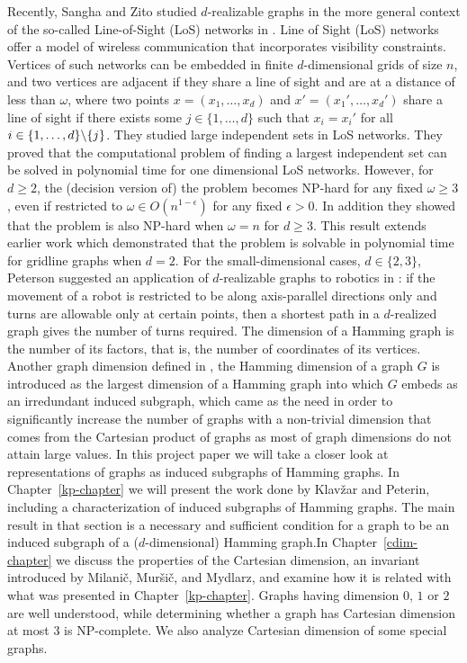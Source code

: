 \documentclass[12pt,a4paper,titlepage,openany]{report}
\begin{document}
Recently, Sangha and Zito studied $d$-realizable graphs in the more general context of the so-called Line-of-Sight (LoS) networks in \cite{Zito}. Line of Sight (LoS) networks offer a model of wireless communication that incorporates visibility constraints. Vertices of such networks can be embedded in finite $d$-dimensional grids of size $n$, and two vertices are adjacent if they share a line of sight and are at a distance of less than $\omega$, where two points $x=(x_1, \ldots,x_d)$ and $x'=(x_1',\ldots ,x_d')$ share a line of sight if there exists some $j\in \{1,\ldots,d\}$ such that $x_i=x_i'$ for all $i\in \{1,\ldots,d\} \symbol{92} \{j\}$. They studied large independent sets in LoS networks. They proved that the computational problem of finding a largest independent set can be solved in polynomial time for one dimensional LoS networks. However, for $d \geq 2$, the (decision version of) the problem becomes NP-hard for any fixed $\omega \geq 3$, even if restricted to $\omega \in O(n^{1-\epsilon})$ for any fixed $\epsilon>0$. In addition they showed that the problem is also NP-hard when $\omega = n$ for $d \geq 3$. This result extends earlier work which demonstrated that the problem is solvable in polynomial time for gridline graphs when $d = 2$. For the small-dimensional cases, $d \in \{2, 3\}$, Peterson suggested an application of $d$-realizable graphs to robotics in \cite{Peterson}: if the movement of a robot is restricted to be along axis-parallel directions only and turns are allowable only at certain points, then a shortest path in a $d$-realized graph gives the number of turns required.\newline
The dimension of a Hamming graph is the number of its factors, that is, the number of coordinates of its vertices.\newline
Another graph dimension defined in \cite{Sandi}, the Hamming dimension of a graph $G$ is introduced as the largest dimension of a Hamming graph into which $G$ embeds as an irredundant induced subgraph, which came as the need in order to significantly increase the number of graphs with a non-trivial dimension that comes from the Cartesian product of graphs as most of graph dimensions do not attain large values.
\newline
In this project paper we will take a closer look at representations of graphs as induced subgraphs of Hamming graphs. In Chapter~\ref{kp-chapter} we will present the work done by Klav\v zar and Peterin, including a characterization of induced subgraphs of Hamming graphs. The main result in that section is a necessary and sufficient condition for a graph to be an induced subgraph of a ($d$-dimensional) Hamming graph.\newline In Chapter~\ref{cdim-chapter} we discuss the properties of the Cartesian dimension, an invariant introduced by Milani\v c, Mur\v si\v c, and Mydlarz, and examine how it is related with what was presented in Chapter~\ref{kp-chapter}. Graphs having dimension $0$, $1$ or $2$ are well understood, while determining whether a graph has Cartesian dimension at most 3 is NP-complete. We also analyze Cartesian dimension of some special graphs.\newline
\end{document}

